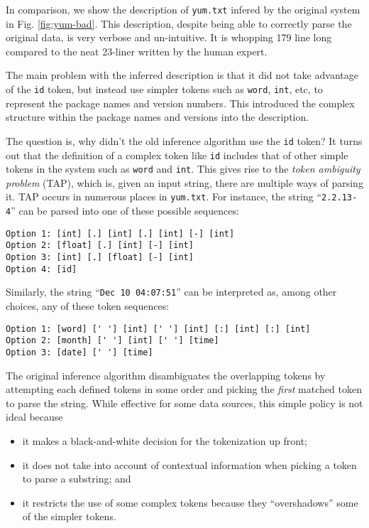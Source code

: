 In comparison, we show the description of {\tt yum.txt} infered by
the original \learnpads{} system \cite{fisher+:dirttoshovels,fisher+:sigmod08}
in Fig. \ref{fig:yum-bad}. 
This description, despite being able to correctly parse the original data,
is very verbose and un-intuitive. It is whopping 179 line long compared 
to the neat 23-liner written by the human expert.

The main problem with the inferred description is that it 
did not take advantage of the {\tt id} token, but instead 
use simpler tokens such as {\tt word}, {\tt int}, etc,
to represent the package names and version numbers. 
This introduced the complex structure within the package names 
and versions into the description. 

The question is, why didn't the old inference algorithm use
the {\tt id} token? It turns out that the definition of a complex token
like {\tt id} includes that of other simple tokens in the system such as 
{\tt word} and {\tt int}. This gives rise to the 
{\em token ambiguity problem} (TAP), which is, given an input
string, there are multiple ways of parsing it.
TAP occurs in numerous places in {\tt yum.txt}. 
For instance, the string ``{\tt 2.2.13-4}'' can be parsed into one of 
these possible sequences:
{\small
\begin{verbatim}
Option 1: [int] [.] [int] [.] [int] [-] [int]
Option 2: [float] [.] [int] [-] [int]
Option 3: [int] [.] [float] [-] [int]
Option 4: [id]
\end{verbatim}
}

Similarly, the string ``{\tt Dec 10 04:07:51}'' can be interpreted as, 
among other choices, any of these token sequences:

{\small
\begin{verbatim}
Option 1: [word] [' '] [int] [' '] [int] [:] [int] [:] [int]
Option 2: [month] [' '] [int] [' '] [time]
Option 3: [date] [' '] [time]
\end{verbatim}
}

The original inference algorithm disambiguates the overlapping
tokens by attempting each defined tokens in some order 
and picking the {\em first} matched token to parse the string. 
While effective for some data sources, this simple policy 
is not ideal because
\begin{itemize}
\item it makes a black-and-white decision for the tokenization up front;
\item it does not take into account of contextual information when picking
      a token to parse a substring; and
\item it restricts the use of some complex tokens because they ``overshadows''
	some of the simpler tokens.
\end{itemize}

